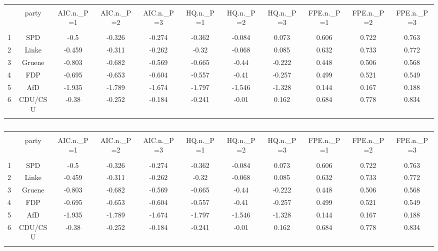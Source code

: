 
\begin{table}[!htbp] \centering 
  \caption{} 
  \label{} 
\begin{tabular}{@{\extracolsep{5pt}} ccccccccccc} 
\\[-1.8ex]\hline 
\hline \\[-1.8ex] 
 & party & AIC.n.\_P=1 & AIC.n.\_P=2 & AIC.n.\_P=3 & HQ.n.\_P=1 & HQ.n.\_P=2 & HQ.n.\_P=3 & FPE.n.\_P=1 & FPE.n.\_P=2 & FPE.n.\_P=3 \\ 
\hline \\[-1.8ex] 
1 & SPD & -0.5 & -0.326 & -0.274 & -0.362 & -0.084 & 0.073 & 0.606 & 0.722 & 0.763 \\ 
2 & Linke & -0.459 & -0.311 & -0.262 & -0.32 & -0.068 & 0.085 & 0.632 & 0.733 & 0.772 \\ 
3 & Gruene & -0.803 & -0.682 & -0.569 & -0.665 & -0.44 & -0.222 & 0.448 & 0.506 & 0.568 \\ 
4 & FDP & -0.695 & -0.653 & -0.604 & -0.557 & -0.41 & -0.257 & 0.499 & 0.521 & 0.549 \\ 
5 & AfD & -1.935 & -1.789 & -1.674 & -1.797 & -1.546 & -1.328 & 0.144 & 0.167 & 0.188 \\ 
6 & CDU/CSU & -0.38 & -0.252 & -0.184 & -0.241 & -0.01 & 0.162 & 0.684 & 0.778 & 0.834 \\ 
\hline \\[-1.8ex] 
\end{tabular} 
\end{table}  

\begin{table}[!htbp] \centering 
  \caption{} 
  \label{} 
\begin{tabular}{@{\extracolsep{5pt}} ccccccccccc} 
\\[-1.8ex]\hline 
\hline \\[-1.8ex] 
 & party & AIC.n.\_P=1 & AIC.n.\_P=2 & AIC.n.\_P=3 & HQ.n.\_P=1 & HQ.n.\_P=2 & HQ.n.\_P=3 & FPE.n.\_P=1 & FPE.n.\_P=2 & FPE.n.\_P=3 \\ 
\hline \\[-1.8ex] 
1 & SPD & -0.5 & -0.326 & -0.274 & -0.362 & -0.084 & 0.073 & 0.606 & 0.722 & 0.763 \\ 
2 & Linke & -0.459 & -0.311 & -0.262 & -0.32 & -0.068 & 0.085 & 0.632 & 0.733 & 0.772 \\ 
3 & Gruene & -0.803 & -0.682 & -0.569 & -0.665 & -0.44 & -0.222 & 0.448 & 0.506 & 0.568 \\ 
4 & FDP & -0.695 & -0.653 & -0.604 & -0.557 & -0.41 & -0.257 & 0.499 & 0.521 & 0.549 \\ 
5 & AfD & -1.935 & -1.789 & -1.674 & -1.797 & -1.546 & -1.328 & 0.144 & 0.167 & 0.188 \\ 
6 & CDU/CSU & -0.38 & -0.252 & -0.184 & -0.241 & -0.01 & 0.162 & 0.684 & 0.778 & 0.834 \\ 
\hline \\[-1.8ex] 
\end{tabular} 
\end{table}  

